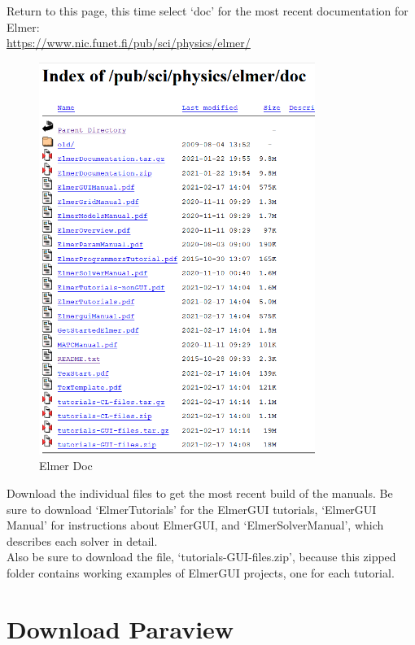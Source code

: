 Return to this page, this time select `doc' for the most recent documentation for Elmer:\\

\url{https://www.nic.funet.fi/pub/sci/physics/elmer/}

\begin{figure}[H]
\centering
\includegraphics[width=0.8\textwidth]{elmer-doc}
\caption{Elmer Doc}\label{fg:elmer-doc}
\end{figure}

Download the individual files to get the most recent build of the manuals.  Be sure to download `ElmerTutorials' for the ElmerGUI tutorials, `ElmerGUI Manual' for instructions about ElmerGUI, and `ElmerSolverManual', which describes each solver in detail.\\

Also be sure to download the file, `tutorials-GUI-files.zip', because this zipped folder contains working examples of ElmerGUI projects, one for each tutorial.

\newpage

\section{Download Paraview}

